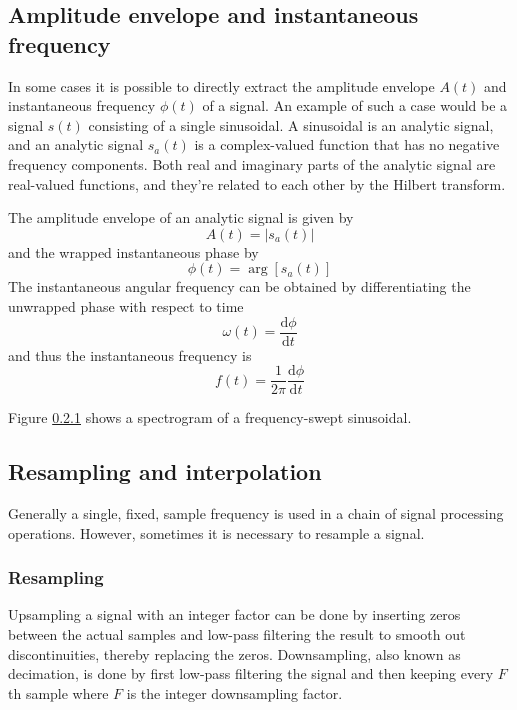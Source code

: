 \subsection{Amplitude envelope and instantaneous frequency}
In some cases it is possible to directly extract the amplitude envelope $A(t)$
and instantaneous frequency $\phi(t)$ of a signal. An example of such a case
would be a signal $s(t)$ consisting of a single sinusoidal. A sinusoidal is an
analytic signal, and an analytic signal $s_a(t)$ is a complex-valued function
that has no negative frequency components. Both real and imaginary parts of the
analytic signal are real-valued functions, and they're related to each other by
the Hilbert transform.

The amplitude envelope of an analytic signal is given by
\begin{equation}
 A(t) = |s_a(t)|
\end{equation}
and the wrapped instantaneous phase by
\begin{equation}
 \phi(t) = \arg{\left[s_a(t) \right]}
\end{equation}
The instantaneous angular frequency can be obtained by differentiating the unwrapped phase with respect to time
\begin{equation}
 \omega (t) = \frac{\mathrm{d}\phi}{\mathrm{d}t}
\end{equation}
and thus the instantaneous frequency is
\begin{equation}
 f (t) = \frac{1}{2\pi} \frac{\mathrm{d}\phi}{\mathrm{d}t}
\end{equation}

Figure \ref{} shows a spectrogram of a frequency-swept sinusoidal.



\newpage
\subsection{Resampling and interpolation}
Generally a single, fixed, sample frequency is used in a chain of signal
processing operations. However, sometimes it is necessary to resample a signal.

\subsubsection{Resampling}
Upsampling a signal with an integer factor can be done by inserting zeros
between the actual samples and low-pass filtering the result to smooth out
discontinuities, thereby replacing the zeros. Downsampling, also known as
decimation, is done by first low-pass filtering the signal and then keeping
every $F$th sample where $F$ is the integer downsampling factor.

